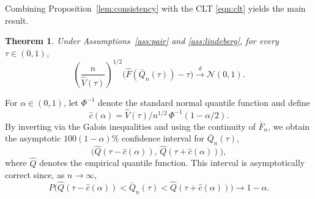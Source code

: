 \documentclass[12pt]{article}
\newtheorem{theorem}{Theorem}%
\theoremstyle{remark}
\newcommand{\p}{P}
\renewcommand{\sqrt}[1]{#1^{1/2}}
\begin{document}
Combining Proposition~\ref{lem:consistency} with the CLT \eqref{eqn:clt} yields the main result.
\begin{theorem}\label{thm:clt}
	Under Assumptions~\ref{ass:pair} and \ref{ass:lindeberg}, for every $\tau\in(0,1)$,
	\begin{equation*}
		\left(\frac{n}{\widehat V(\tau)}\right)^{1/2}
		\bigl(\widehat F(\bar Q_n(\tau))-\tau\bigr)
		\xrightarrow{d}\mathcal{N}(0,1).
	\end{equation*}
\end{theorem}

For $\alpha\in(0,1)$, let $\Phi^{-1}$ denote the standard normal quantile function and define
\begin{equation*}
	\widehat c(\alpha)
	= \sqrt{\widehat V(\tau)/n}\,\Phi^{-1}(1-\alpha/2).
\end{equation*}
By inverting via the Galois inequalities and using the continuity of $\bar F_n$, we obtain the asymptotic $100(1-\alpha)\%$ confidence interval for $\bar Q_n(\tau)$,
\begin{equation*}
	\bigl(\widehat Q(\tau-\widehat c(\alpha)),\,\widehat Q(\tau+\widehat c(\alpha))\bigr),
\end{equation*}
where $\widehat Q$ denotes the empirical quantile function. This interval is asymptotically correct since, as $n\to\infty$,
\begin{equation*}
	\p\bigl(
	\widehat Q(\tau-\widehat c(\alpha))
	<\bar Q_n(\tau)
	< \widehat Q(\tau+\widehat c(\alpha))
	\bigr)\to 1-\alpha.
\end{equation*}
\end{document}
